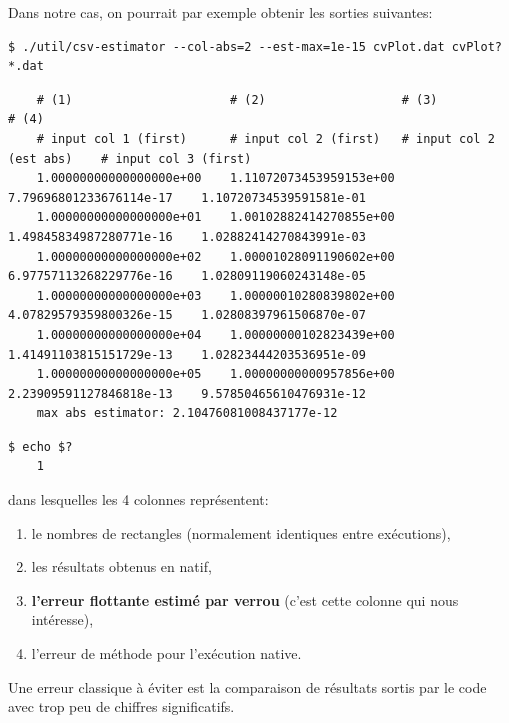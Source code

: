 \documentclass[a4paper]{article}
\newenvironment{commandline}{
  \begin{mdframed}[style=commandline]
}{
  \end{mdframed}
}
\newenvironment{warn}[1][Attention :]{
  \begin{mdframed}[style=warning]
    \noindent{\bf #1}
}{
  \end{mdframed}
}
\begin{document}
\bigskip

Dans notre cas, on pourrait par exemple obtenir les sorties suivantes:
\begin{commandline}
\begin{verbatim}
$ ./util/csv-estimator --col-abs=2 --est-max=1e-15 cvPlot.dat cvPlot?*.dat
\end{verbatim}
{\footnotesize
\begin{verbatim}
    # (1)                      # (2)                   # (3)                      # (4)                   
    # input col 1 (first)      # input col 2 (first)   # input col 2 (est abs)    # input col 3 (first)     
    1.00000000000000000e+00    1.11072073453959153e+00 7.79696801233676114e-17    1.10720734539591581e-01 
    1.00000000000000000e+01    1.00102882414270855e+00 1.49845834987280771e-16    1.02882414270843991e-03 
    1.00000000000000000e+02    1.00001028091190602e+00 6.97757113268229776e-16    1.02809119060243148e-05 
    1.00000000000000000e+03    1.00000010280839802e+00 4.07829579359800326e-15    1.02808397961506870e-07 
    1.00000000000000000e+04    1.00000000102823439e+00 1.41491103815151729e-13    1.02823444203536951e-09 
    1.00000000000000000e+05    1.00000000000957856e+00 2.23909591127846818e-13    9.57850465610476931e-12 
    max abs estimator: 2.10476081008437177e-12
\end{verbatim}
}
\begin{verbatim}
$ echo $?
    1
\end{verbatim}
\end{commandline}
\noindent dans lesquelles les 4 colonnes représentent:
\begin{enumerate}
\item le nombres de rectangles (normalement identiques entre exécutions),
\item les résultats obtenus en natif,
\item {\bf l'erreur flottante estimé par verrou} (c'est cette colonne qui
  nous intéresse),
\item l'erreur de méthode pour l'exécution native.
\end{enumerate}

\bigskip

\begin{warn}
  Une erreur classique à éviter est la comparaison de résultats sortis par le
  code avec trop peu de chiffres significatifs.
\end{warn}
\end{document}
